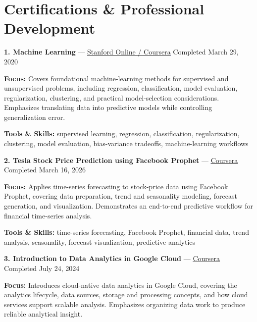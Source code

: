 \documentclass[9pt,letterpaper]{extarticle}
\begin{document}
\section{Certifications \& Professional Development}
\noindent\textbf{1. Machine Learning} {\small --- \textcolor{blue}{\underline{\href{https://www.coursera.org/account/accomplishments/verify/VU3Y5TBLVLZT}{Stanford Online / Coursera}}} \textbar{} Completed \textbar{} March 29, 2020}\par
\textbf{Focus:} Covers foundational machine-learning methods for supervised and unsupervised problems, including regression, classification, model evaluation, regularization, clustering, and practical model-selection considerations. Emphasizes translating data into predictive models while controlling generalization error.\par
{\small\textbf{Tools \& Skills:} supervised learning, regression, classification, regularization, clustering, model evaluation, bias-variance tradeoffs, machine-learning workflows\par}
\vspace{2pt}
\noindent\textbf{2. Tesla Stock Price Prediction using Facebook Prophet} {\small --- \textcolor{blue}{\underline{\href{https://www.coursera.org/account/accomplishments/verify/05C4RBWX0A39}{Coursera}}} \textbar{} Completed \textbar{} March 16, 2026}\par
\textbf{Focus:} Applies time-series forecasting to stock-price data using Facebook Prophet, covering data preparation, trend and seasonality modeling, forecast generation, and visualization. Demonstrates an end-to-end predictive workflow for financial time-series analysis.\par
{\small\textbf{Tools \& Skills:} time-series forecasting, Facebook Prophet, financial data, trend analysis, seasonality, forecast visualization, predictive analytics\par}
\vspace{2pt}
\noindent\textbf{3. Introduction to Data Analytics in Google Cloud} {\small --- \textcolor{blue}{\underline{\href{https://www.coursera.org/account/accomplishments/verify/R9FGPRZ3NJE8}{Coursera}}} \textbar{} Completed \textbar{} July 24, 2024}\par
\textbf{Focus:} Introduces cloud-native data analytics in Google Cloud, covering the analytics lifecycle, data sources, storage and processing concepts, and how cloud services support scalable analysis. Emphasizes organizing data work to produce reliable analytical insight.\par
\end{document}

